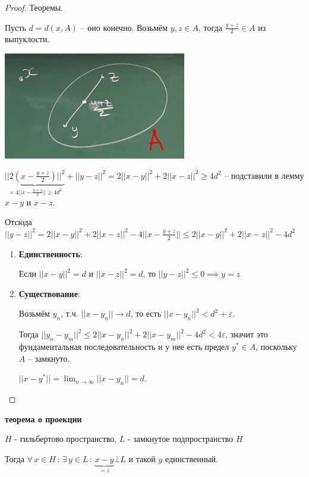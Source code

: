 \begin{proof}
    Теоремы.

    Пусть $d = d(x, A)$ -- оно конечно. Возьмём $y, z \in A$, тогда $\frac{y + z}{2} \in A$ из выпуклости.

    \begin{center}
        \includegraphics[width=8cm]{assets/05-fourierreihe/existance-of-the-best-approximation.png}
    \end{center}
    
    $\underbrace{|| 2 \left(x - \frac{y + z}{2}\right) ||^2}_{= 4 || x - \frac{y + z}{2} || \geqslant 4d^2} + ||y - z||^2 = 2 ||x - y||^2 + 2||x - z||^2 \geqslant 4d^2$ -- подставили в лемму $x - y$ и $x - z$.

    Отсюда $||y-z||^2 = 2 ||x - y||^2 + 2 ||x - z||^2 - 4 || x - \frac{y + z}{2}|| \leqslant 2 ||x - y||^2 + 2||x - z||^2 - 4d^2$

    \begin{enumerate}
        \item {
            \textbf{Единственность}:

            Если $||x - y||^2 = d$ и $||x - z||^2 = d$, то $||y - z||^2 \leqslant 0 \implies y = z$
        }
        \item {
            \textbf{Существование}:

            Возьмём $y_n$, т.ч. $||x - y_n|| \rightarrow d$, то есть $|| x - y_n ||^2 < d^2 + \varepsilon$.
            
            Тогда $||y_n - y_m||^2 \leqslant 2 ||x - y_n||^2 + 2||x - y_m||^2 - 4d^2 < 4\varepsilon$, значит это фундаментальная последовательность и у нее есть предел $y^* \in A$, поскольку $A$ -- замкнуто.
            
            $||x - y^*|| = \lim_{n \to \infty} ||x - y_n|| = d$.
        }
    \end{enumerate}
\end{proof}

\begin{theorem}
    \textbf{теорема о проекции}

    $H$ - гильбертово пространство, $L$ - замкнутое подпространство $H$

    Тогда $\forall \, x \in H \, : \, \exists \, y \in L \, : \, \underbrace{x - y}_{=z} \bot L$ и 
    такой $y$ единственный.
\end{theorem}

